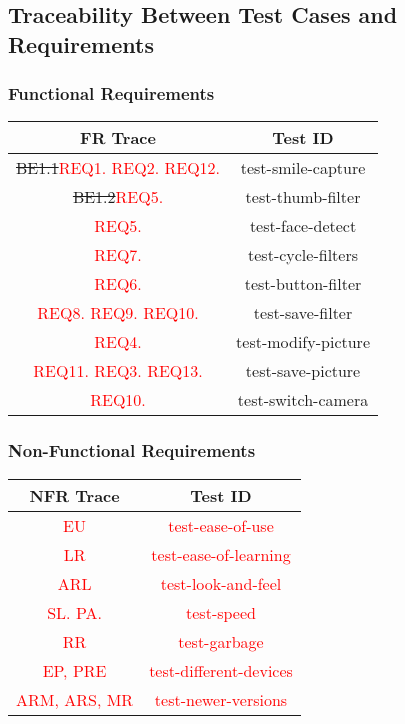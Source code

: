 \documentclass[12pt, titlepage]{article}
\begin{document}
\subsection{Traceability Between Test Cases and Requirements}

\subsubsection{Functional Requirements}

\begin{center}
\begin{tabular}{ |c|c| } 
 \hline
 FR Trace & Test ID \\ 
  \hline
   \hline
\sout{BE1.1}\textcolor{red}{REQ1. REQ2. REQ12.} & test-smile-capture \\ 
  \hline
\sout{BE1.2}\textcolor{red}{REQ5.} & test-thumb-filter \\ 
 \hline
 \textcolor{red}{REQ5.} & test-face-detect \\ 
 \hline
 \textcolor{red}{REQ7.} & test-cycle-filters \\ 
 \hline
 \textcolor{red}{REQ6.} & test-button-filter \\ 
 \hline
 \textcolor{red}{REQ8. REQ9. REQ10.} & test-save-filter \\ 
 \hline
 \textcolor{red}{REQ4.} & test-modify-picture \\ 
 \hline
 \textcolor{red}{REQ11. REQ3. REQ13.} & test-save-picture \\ 
 \hline
 \textcolor{red}{REQ10.} & test-switch-camera \\ 
 \hline
\end{tabular}
\end{center}

\subsubsection{Non-Functional Requirements}
\begin{center}
\begin{tabular}{ |c|c| } 
 \hline
 NFR Trace & Test ID \\ 
  \hline
   \hline
\textcolor{red}{EU} & \textcolor{red}{test-ease-of-use} \\ 
  \hline
\textcolor{red}{LR} & \textcolor{red}{test-ease-of-learning} \\ 
  \hline
  \textcolor{red}{ARL} & \textcolor{red}{test-look-and-feel} \\ 
  \hline
\textcolor{red}{SL. PA.} & \textcolor{red}{test-speed} \\ 
  \hline
\textcolor{red}{RR} & \textcolor{red}{test-garbage} \\ 
  \hline
\textcolor{red}{EP, PRE} & \textcolor{red}{test-different-devices} \\ 
  \hline
\textcolor{red}{ARM, ARS, MR} & \textcolor{red}{test-newer-versions} \\ 
 \hline
\end{tabular}
\end{center}
\end{document}
